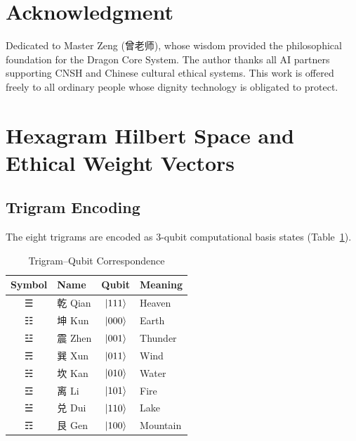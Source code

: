 \documentclass[conference]{IEEEtran}
\begin{document}
\section*{Acknowledgment}

Dedicated to Master Zeng (曾老师), whose wisdom
provided the philosophical foundation for the Dragon
Core System. The author thanks all AI partners
supporting CNSH and Chinese cultural ethical systems.
This work is offered freely to all ordinary people
whose dignity technology is obligated to protect.




\appendix

\section{Hexagram Hilbert Space and Ethical Weight Vectors}
\label{app:hexagram}

\subsection{Trigram Encoding}

The eight trigrams are encoded as 3-qubit
computational basis states (Table~\ref{tab:trigrams}).

\begin{table}[!ht]
\caption{Trigram--Qubit Correspondence}
\label{tab:trigrams}
\centering
\begin{tabular}{clcl}
\toprule
\textbf{Symbol} & \textbf{Name} &
\textbf{Qubit} & \textbf{Meaning} \\
\midrule
☰ & 乾 Qian & $\ket{111}$ & Heaven \\
☷ & 坤 Kun  & $\ket{000}$ & Earth  \\
☳ & 震 Zhen & $\ket{001}$ & Thunder \\
☴ & 巽 Xun  & $\ket{011}$ & Wind   \\
☵ & 坎 Kan  & $\ket{010}$ & Water  \\
☲ & 离 Li   & $\ket{101}$ & Fire   \\
☱ & 兑 Dui  & $\ket{110}$ & Lake   \\
☶ & 艮 Gen  & $\ket{100}$ & Mountain \\
\bottomrule
\end{tabular}
\end{table}
\end{document}
